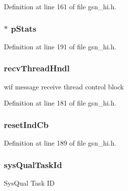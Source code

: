 Definition at line 161 of file gsn\_\-hi.h.

\hypertarget{a00085_ad4d017d4879246dcdc740c6738efede0}{
\subsubsection[{pStats}]{$\ast$ {\bf pStats}}}
\label{a00085_ad4d017d4879246dcdc740c6738efede0}


Definition at line 191 of file gsn\_\-hi.h.

\hypertarget{a00085_afdaed19184edc021e1cc45d4dae26980}{
\subsubsection[{recvThreadHndl}]{ {\bf recvThreadHndl}}}
\label{a00085_afdaed19184edc021e1cc45d4dae26980}
wif message receive thread control block 

Definition at line 181 of file gsn\_\-hi.h.

\hypertarget{a00085_a1bdc9efcf75bebaf89a89e8dc336226f}{
\subsubsection[{resetIndCb}]{ {\bf resetIndCb}}}
\label{a00085_a1bdc9efcf75bebaf89a89e8dc336226f}


Definition at line 189 of file gsn\_\-hi.h.

\hypertarget{a00085_a3d8d24efe6d7728a0e60320295f3f6c2}{
\subsubsection[{sysQualTaskId}]{ {\bf sysQualTaskId}}}
\label{a00085_a3d8d24efe6d7728a0e60320295f3f6c2}
SysQual Task ID 

